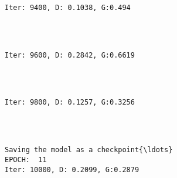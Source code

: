 \documentclass[11pt]{article}
\begin{document}
    \begin{Verbatim}[commandchars=\\\{\}]

Iter: 9400, D: 0.1038, G:0.494
    \end{Verbatim}

    \begin{center}
    \end{center}
    { \hspace*{\fill} \\}
    
    \begin{Verbatim}[commandchars=\\\{\}]

Iter: 9600, D: 0.2842, G:0.6619
    \end{Verbatim}

    \begin{center}
    \end{center}
    { \hspace*{\fill} \\}
    
    \begin{Verbatim}[commandchars=\\\{\}]

Iter: 9800, D: 0.1257, G:0.3256
    \end{Verbatim}

    \begin{center}
    \end{center}
    { \hspace*{\fill} \\}
    
    \begin{Verbatim}[commandchars=\\\{\}]

Saving the model as a checkpoint{\ldots}
EPOCH:  11
Iter: 10000, D: 0.2099, G:0.2879
    \end{Verbatim}

    \begin{center}
    \end{center}
    { \hspace*{\fill} \\}
    
\end{document}
